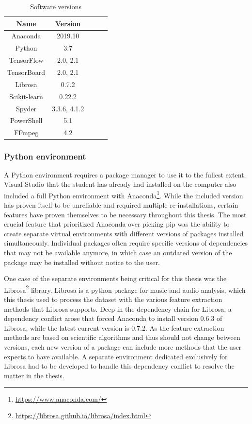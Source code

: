 \begin{table}[ht]
    \centering
    \begin{tabular}{|c|c|c|c|c|}
        \hline
        Name & Version\\ \hline
        Anaconda & 2019.10\\ \hline
        Python & 3.7\\ \hline
        TensorFlow & 2.0, 2.1\\ \hline
        TensorBoard & 2.0, 2.1\\ \hline
        Librosa & 0.7.2\\ \hline
        Scikit-learn & 0.22.2\\ \hline
        Spyder & 3.3.6, 4.1.2\\ \hline
        PowerShell & 5.1\\ \hline
        FFmpeg & 4.2\\ \hline
        
    \end{tabular}
    \caption{Software versions}
    \label{tab:software}
\end{table}

\subsubsection{Python environment}
A Python environment requires a package manager to use it to the fullest extent.
Visual Studio that the student has already had installed on the computer also included a full Python environment with Anaconda\footnote{\url{https://www.anaconda.com/}}.
While the included version has proven itself to be unreliable and required multiple re-installations, certain features have proven themselves to be necessary throughout this thesis.
The most crucial feature that prioritized Anaconda over picking pip was the ability to create separate virtual environments with different versions of packages installed simultaneously.
Individual packages often require specific versions of dependencies that may not be available anymore, in which case an outdated version of the package may be installed without notice to the user.

One case of the separate environments being critical for this thesis was the Librosa\footnote{\url{https://librosa.github.io/librosa/index.html}} library.
Librosa is a python package for music and audio analysis, which this thesis used to process the dataset with the various feature extraction methods that Librosa supports.
Deep in the dependency chain for Librosa, a dependency conflict arose that forced Anaconda to install version 0.6.3 of Librosa, while the latest current version is 0.7.2.
As the feature extraction methods are based on scientific algorithms and thus should not change between versions, each new version of a package can include more methods that the user expects to have available.
A separate environment dedicated exclusively for Librosa had to be developed to handle this dependency conflict to resolve the matter in the thesis.


